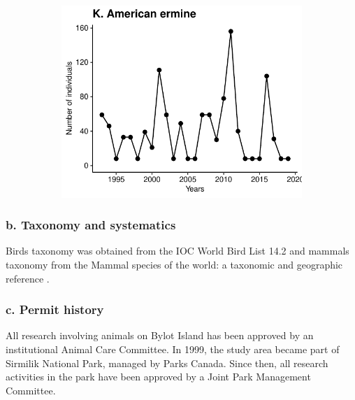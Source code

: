 \documentclass[a4paper,twoside,12pt]{article}
\begin{document}
\begin{figure}[h]
\begin{subfigure}{0.45\textwidth}
    \includegraphics[width=\linewidth]{figures/species_temporal_series/American_ermine.pdf}
  \end{subfigure}
\end{figure}
\newpage

\newpage
                        
                        \subsubsection*{b. Taxonomy and systematics}
Birds taxonomy was obtained from the IOC World Bird List 14.2 \citep{gill2024} and mammals taxonomy from the Mammal species of the world: a taxonomic and geographic reference \citep{MammalDiversityDatabase}.
                        
                        \subsubsection*{c. Permit history}
All research involving animals on Bylot Island has been approved by an institutional Animal Care Committee. In 1999, the study area became part of Sirmilik National Park, managed by Parks Canada. Since then, all research activities in the park have been approved by a Joint Park Management Committee.
      
\end{document}
